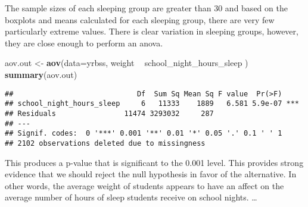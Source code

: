 \documentclass[
]{article}
\newenvironment{Shaded}{\begin{snugshade}}{\end{snugshade}}
\newcommand{\DataTypeTok}[1]{\textcolor[rgb]{0.13,0.29,0.53}{#1}}
\newcommand{\KeywordTok}[1]{\textcolor[rgb]{0.13,0.29,0.53}{\textbf{#1}}}
\newcommand{\NormalTok}[1]{#1}
\newcommand{\OperatorTok}[1]{\textcolor[rgb]{0.81,0.36,0.00}{\textbf{#1}}}
\newcommand{\StringTok}[1]{\textcolor[rgb]{0.31,0.60,0.02}{#1}}
\begin{document}
The sample sizes of each sleeping group are greater than 30 and based on
the boxplots and means calculated for each sleeping group, there are
very few particularly extreme values. There is clear variation in
sleeping groups, however, they are close enough to perform an anova.

\begin{Shaded}
\begin{Highlighting}[]
\NormalTok{aov.out <-}\StringTok{ }\KeywordTok{aov}\NormalTok{(}\DataTypeTok{data=}\NormalTok{yrbss, weight }\OperatorTok{~}\StringTok{ }\NormalTok{school_night_hours_sleep )}
\KeywordTok{summary}\NormalTok{(aov.out)}
\end{Highlighting}
\end{Shaded}

\begin{verbatim}
##                             Df  Sum Sq Mean Sq F value  Pr(>F)    
## school_night_hours_sleep     6   11333    1889   6.581 5.9e-07 ***
## Residuals                11474 3293032     287                    
## ---
## Signif. codes:  0 '***' 0.001 '**' 0.01 '*' 0.05 '.' 0.1 ' ' 1
## 2102 observations deleted due to missingness
\end{verbatim}

This produces a p-value that is significant to the 0.001 level. This
provides strong evidence that we should reject the null hypothesis in
favor of the alternative. In other words, the average weight of students
appears to have an affect on the average number of hours of sleep
students receive on school nights. \ldots{}
\end{document}
